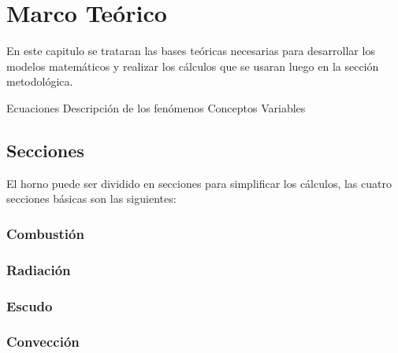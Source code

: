 \chapter{Marco Teórico}

\par En este capitulo se trataran las bases teóricas necesarias para desarrollar los modelos matemáticos y realizar los cálculos que se usaran luego en la sección metodológica. 

Ecuaciones
Descripción de los fenómenos
Conceptos
Variables

\section{Secciones}

\par El horno puede ser dividido en secciones para simplificar los cálculos, las cuatro secciones b\'asicas son las siguientes:

\subsection{Combustión}
\subsection{Radiación}
\subsection{Escudo}
\subsection{Convección}